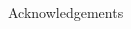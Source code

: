 \documentclass{beamer}
\begin{document}
\begin{frame}
\begin{columns}[t]
\begin{column}{.417\linewidth}
\begin{section}{Acknowledgements}
        \end{section} 

      \end{column}

    \end{columns}

  \end{frame}
\end{document}
